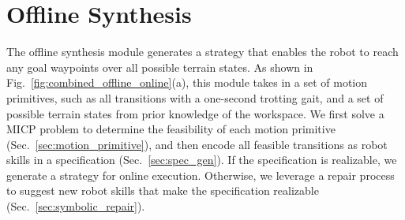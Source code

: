 \documentclass[letterpaper, 10 pt, conference]{ieeeconf}
\begin{document}

\section{Offline Synthesis}\label{sec:reactive_gait_synthesis}
The offline synthesis module 
generates a strategy 
that enables the robot
to reach any goal waypoints over all possible terrain states.
%
As shown in Fig.~\ref{fig:combined_offline_online}(a),
this module takes in
a set of motion primitives,
such as all transitions with a one-second trotting gait,
and
a set of possible terrain states from prior knowledge of the workspace.
We first solve a MICP problem to determine the feasibility of each motion primitive 
(Sec.~\ref{sec:motion_primitive}), and then encode all feasible transitions as robot skills in a specification
(Sec.~\ref{sec:spec_gen}).
If the specification is realizable, we generate a strategy for online execution.
Otherwise, we leverage a repair process to suggest new robot skills that make the specification realizable
(Sec.~\ref{sec:symbolic_repair}).


\end{document}
